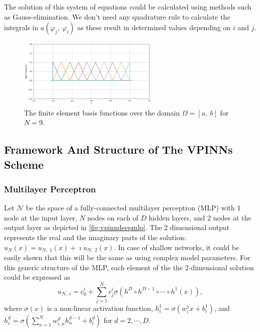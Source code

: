 The solution of this system of equations could be calculated using methods such as Gauss-elimination. We don't need any quadrature rule to calculate the integrals in $a(\varphi_j,\:\varphi_i)$ as these result in determined values depending on $i$ and $j$.

\begin{figure}[h]
    \centering
    \includegraphics[width = 0.6\textwidth]{img/FEMBasisFunctions.png}
    \caption{The finite element basis functions over the domain $\Omega = [a,\:b]$ for $N=9$.}
    \label{fig:fembases}
\end{figure}

\subsection{Framework And Structure of The VPINNs Scheme}\label{sec:vpinnsframework}

\subsubsection{Multilayer Perceptron}\label{sec:vpinnsmlp}
Let $\mathcal{N}$ be the space of a fully-connected multilayer perceptron (MLP) with 1 node at the input layer, $N$ nodes on each of $D$ hidden layers, and 2 nodes at the output layer as depicted in \autoref{fig:vpinndeepmlp}. The 2 dimensional output represents the real and the imaginary parts of the solution: $u_N(x) = u_{N,\;1}(x) + \imath u_{N,\;2}(x)$. In case of shallow networks, it could be easily shown that this will be the same as using complex model parameters. For this generic structure of the MLP, each element of the the 2-dimensional solution could be expressed as
\begin{equation}
    \label{eq:vpinngeneric}
    u_{N,\;i} = c_0^i + \sum_{j=1}^{N}{c_j^i \sigma(h^{D} \circ h^{D-1} \circ \cdots \circ h^1(x))},
\end{equation}
where $\sigma (x)$ is a non-linear activation function, $h^1_i = \sigma(w^1_i x + b^1_i)$, and
$h^d_i = \sigma(\sum_{n=1}^{N}{w^d_{i, n} h^{d-1}_n} + b^d_i)$ for $d = 2, \cdots, D$.

